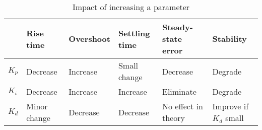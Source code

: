 \begin{table}[H]
\centering
\begin{tabular}{|l|l|l|l|l|l|}
\hline
           & \textbf{Rise time}    & \textbf{Overshoot} & \textbf{Settling time} & \textbf{Steady-state error}  & \textbf{Stability}              \\ \hline
$K_p$      & Decrease     & Increase  & Small change  & Decrease            & Degrade                \\ \hline
$K_i$      & Decrease     & Increase  & Increase      & Eliminate           & Degrade                \\ \hline
$K_d$      & Minor change & Decrease  & Decrease      & No effect in theory & Improve if $K_d$ small \\ \hline
\end{tabular}
\caption{Impact of increasing a parameter}
\label{Manual-tuning}
\end{table}
